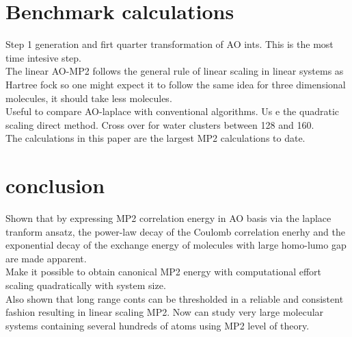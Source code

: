 \documentclass[10pt, draft]{article}
\begin{document}
\section{Benchmark calculations}
Step 1 generation and firt quarter transformation of AO ints. This is the most time intesive step.\\
The linear AO-MP2 follows the general rule of linear scaling in linear systems as Hartree fock so one might expect it to follow the same idea for three dimensional molecules, it should take less molecules.\\
Useful to compare AO-laplace with conventional algorithms.  Us e the quadratic scaling direct method.  Cross over for water clusters between 128 and 160.  \\
The calculations in this paper are the largest MP2 calculations to date.

\section{conclusion}
Shown that by expressing MP2 correlation energy in AO basis via the laplace tranform ansatz, the power-law decay of the Coulomb correlation enerhy and the exponential decay of the exchange energy of molecules with large homo-lumo gap are made apparent.\\
Make it possible to obtain canonical MP2 energy with computational effort scaling quadratically with system size. \\
Also shown that long range conts can be thresholded in a reliable and consistent fashion resulting in linear scaling MP2.  Now can study very large molecular systems containing several hundreds of atoms using MP2 level of theory.
\end{document}
